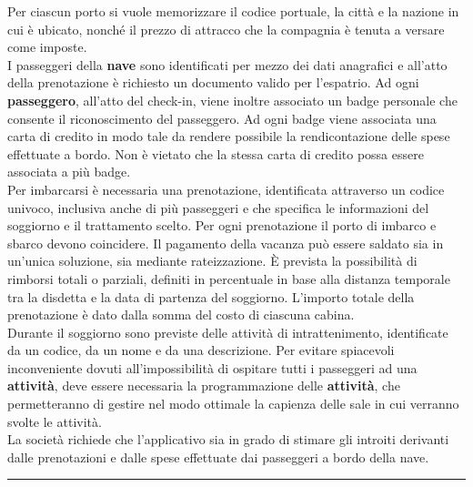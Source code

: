 \documentclass[a4paper, titlepage]{report}
\begin{document}
\begin{linenumbers}
	\noindent
	Per ciascun porto si vuole memorizzare il codice portuale, la città e la nazione in cui è ubicato, nonché il prezzo di attracco che la compagnia è tenuta a versare come imposte. \\
	
	\noindent
	I passeggeri della \textbf{nave} sono identificati per mezzo dei dati anagrafici e all'atto della prenotazione è richiesto un documento valido per l'espatrio. Ad ogni \textbf{passeggero}, all'atto del check-in, viene inoltre associato un badge personale che consente il riconoscimento del passeggero. Ad ogni badge viene associata una carta di credito in modo tale da rendere possibile la rendicontazione delle spese effettuate a bordo. Non è vietato che la stessa carta di credito possa essere associata a più badge. \\
	
	\noindent
	Per imbarcarsi è necessaria una prenotazione, identificata attraverso un codice univoco, inclusiva anche di più passeggeri e che specifica le informazioni del soggiorno e il trattamento scelto. Per ogni prenotazione il porto di imbarco e sbarco devono coincidere. Il pagamento della vacanza può essere saldato sia in un'unica soluzione, sia mediante rateizzazione. È prevista la possibilità di rimborsi totali o parziali, definiti in percentuale in base alla distanza temporale tra la disdetta e la data di partenza del soggiorno. L'importo totale della prenotazione è dato dalla somma del costo di ciascuna cabina. \\
	
	\noindent
	Durante il soggiorno sono previste delle attività di intrattenimento, identificate da un codice, da un nome e da una descrizione. Per evitare spiacevoli inconveniente dovuti all'impossibilità di ospitare tutti i passeggeri ad una \textbf{attività}, deve essere necessaria la programmazione delle \textbf{attività}, che permetteranno di gestire nel modo ottimale la capienza delle sale in cui verranno svolte le attività. \\
	
	\noindent
	La società richiede che l'applicativo sia in grado di stimare gli introiti derivanti dalle prenotazioni e dalle spese effettuate dai passeggeri a bordo della nave. 	

	\end{linenumbers}

    \vspace{0,2cm}
	\noindent\rule{\textwidth}{0.4pt}
	
\vspace{0,3cm}
\end{document}
